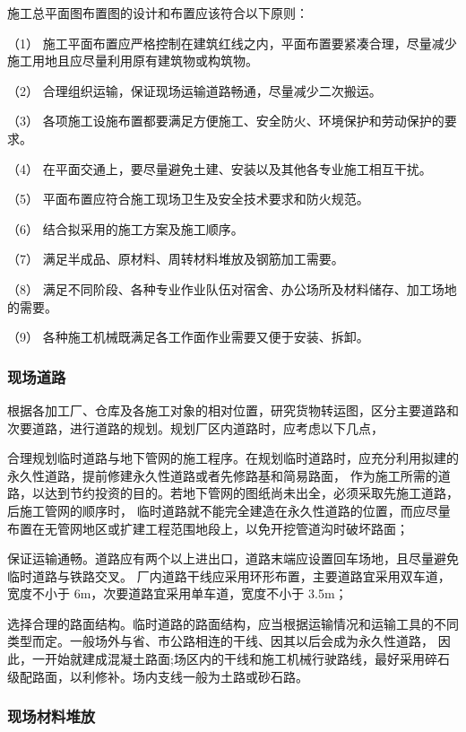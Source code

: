 施工总平面图布置图的设计和布置应该符合以下原则：

（1） 施工平面布置应严格控制在建筑红线之内，平面布置要紧凑合理，尽量减少施工用地且应尽量利用原有建筑物或构筑物。

（2） 合理组织运输，保证现场运输道路畅通，尽量减少二次搬运。

（3） 各项施工设施布置都要满足方便施工、安全防火、环境保护和劳动保护的要求。

（4） 在平面交通上，要尽量避免土建、安装以及其他各专业施工相互干扰。

（5） 平面布置应符合施工现场卫生及安全技术要求和防火规范。

（6） 结合拟采用的施工方案及施工顺序。

（7） 满足半成品、原材料、周转材料堆放及钢筋加工需要。

（8） 满足不同阶段、各种专业作业队伍对宿舍、办公场所及材料储存、加工场地的需要。

（9） 各种施工机械既满足各工作面作业需要又便于安装、拆卸。

\subsubsection{现场道路}

根据各加工厂、仓库及各施工对象的相对位置，研究货物转运图，区分主要道路和次要道路，进行道路的规划。规划厂区内道路时，应考虑以下几点，

 合理规划临时道路与地下管网的施工程序。在规划临时道路时，应充分利用拟建的永久性道路，提前修建永久性道路或者先修路基和简易路面，
作为施工所需的道路，以达到节约投资的目的。若地下管网的图纸尚未出全，必须采取先施工道路，后施工管网的顺序时，
临时道路就不能完全建造在永久性道路的位置，而应尽量布置在无管网地区或扩建工程范围地段上，以免开挖管道沟时破坏路面；

 保证运输通畅。道路应有两个以上进出口，道路末端应设置回车场地，且尽量避免临时道路与铁路交叉。
厂内道路干线应采用环形布置，主要道路宜采用双车道，宽度不小于 6m，次要道路宜采用单车道，宽度不小于 3.5m；

 选择合理的路面结构。临时道路的路面结构，应当根据运输情况和运输工具的不同类型而定。一般场外与省、市公路相连的干线、因其以后会成为永久性道路，
因此，一开始就建成混凝土路面;场区内的干线和施工机械行驶路线，最好采用碎石级配路面，以利修补。场内支线一般为土路或砂石路。

\subsubsection{现场材料堆放}

